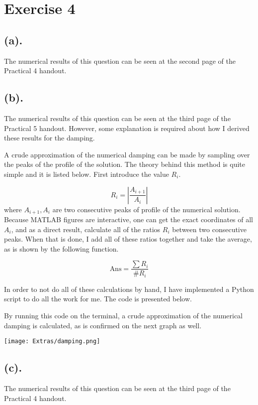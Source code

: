 
\section{Exercise 4}

\subsection{(a).}
\label{subsec: 4a}
The numerical results of this question can be seen at the second page of the Practical 4 handout.

\subsection{(b).}
\label{subsec: 4b}
The numerical results of this question can be seen at the third page of the Practical 5 handout. However, some explanation is required about how I derived these results for the damping.

A crude approximation of the numerical damping can be made by sampling over the peaks of the profile of the solution. The theory behind this method is quite simple and it is listed below. First introduce the value \( R_i \).

\[
	R_i = \left| \frac{A_{i+1}}{A_{i}} \right|
\]
where \( A_{i+1}, A_{i} \) are two consecutive peaks of profile of the numerical solution. Because MATLAB figures are interactive, one can get the exact coordinates of all \(A_i\), and as a direct result, calculate all of the ratios \( R_i \) between two consecutive peaks. When that is done, I add all of these ratios together and take the average, as is shown by the following function.

\[
	\text{Ans} = \frac{\sum R_i}{\# R_i}
\]

In order to not do all of these calculations by hand, I have implemented a Python script to do all the work for me. The code is presented below.



By running this code on the terminal, a crude approximation of the numerical damping is calculated, as is confirmed on the next graph as well.

\begin{center}
	\texttt{[image: Extras/damping.png]}
\end{center}

\subsection{(c).}
The numerical results of this question can be seen at the third page of the Practical 4 handout.
